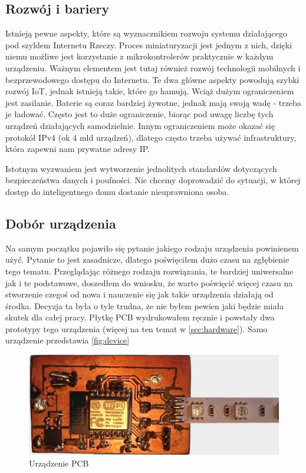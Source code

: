\subsection{Rozwój i bariery}
\label{sec:rozwoj_bariery}
Istnieją pewne aspekty, które są wyznacznikiem rozwoju systemu działającego pod szyldem Internetu Rzeczy. 
Proces miniaturyzacji jest jednym z nich, dzięki niemu możliwe jest korzystanie z mikrokontrolerów praktycznie w każdym urządzeniu. Ważnym elementem jest tutaj również rozwój technologii mobilnych i bezprzewodowego dostępu do Internetu. Te dwa główne aspekty powodują szybki rozwój IoT, jednak istnieją takie, które go hamują. 
Wciąż dużym ograniczeniem jest zasilanie. Baterie są coraz bardziej żywotne, jednak mają swoją wadę - trzeba je ładować. Często jest to duże ograniczenie, biorąc pod uwagę liczbę tych urządzeń działających samodzielnie. Innym ograniczeniem może okazać się protokół IPv4 (ok 4 mld urządzeń), dlatego często trzeba używać infrastruktury, która zapewni nam prywatne adresy IP. 

Istotnym wyzwaniem jest wytworzenie jednolitych standardów dotyczących bezpieczeństwa danych i poufności. Nie chcemy doprowadzić do sytuacji, w której dostęp do inteligentnego domu dostanie nieuprawniona osoba. 

\subsection{Dobór urządzenia}
Na samym początku pojawiło się pytanie jakiego rodzaju urządzenia powinienem użyć. Pytanie to jest zasadnicze, dlatego poświęciłem dużo czasu na zgłębienie tego tematu. Przeglądając różnego rodzaju rozwiązania, te bardziej uniwersalne jak i te podstawowe, doszedłem do wniosku, że warto poświęcić więcej czasu na stworzenie czegoś od nowa i nauczenie się jak takie urządzenia działają od środka. Decyzja ta była o tyle trudna, że nie byłem pewien jaki będzie miała skutek dla całej pracy. Płytkę PCB wydrukowałem ręcznie i powstały dwa prototypy tego urządzenia (więcej na ten temat w \autoref{sec:hardware}). Samo urządzenie przedstawia \autoref{fig:device}
\begin{figure}[!htbp]
	\centering
	\includegraphics[width=1.0\textwidth]{images/device.png}
	\caption[Urządzenie PCB.]{Urządzenie PCB}
	\label{fig:device}
\end{figure}

